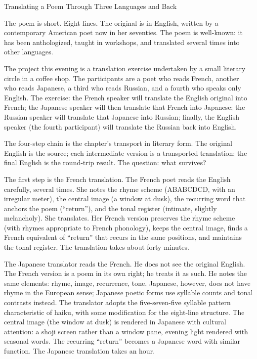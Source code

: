 \begin{coda}{Translating a Poem Through Three Languages and Back}

The poem is short. Eight lines. The original is in English, written
by a contemporary American poet now in her seventies. The poem is
well-known: it has been anthologized, taught in workshops, and
translated several times into other languages.

The project this evening is a translation exercise undertaken by a
small literary circle in a coffee shop. The participants are a
poet who reads French, another who reads Japanese, a third who
reads Russian, and a fourth who speaks only English. The
exercise: the French speaker will translate the English original
into French; the Japanese speaker will then translate that French
into Japanese; the Russian speaker will translate that Japanese
into Russian; finally, the English speaker (the fourth participant)
will translate the Russian back into English.

The four-step chain is the chapter's transport in literary form.
The original English is the source; each intermediate version is
a transported translation; the final English is the round-trip
result. The question: what survives?

The first step is the French translation. The French poet reads
the English carefully, several times. She notes the rhyme scheme
(ABABCDCD, with an irregular meter), the central image (a
window at dusk), the recurring word that anchors the poem
(``return''), and the tonal register (intimate, slightly
melancholy). She translates. Her French version preserves the
rhyme scheme (with rhymes appropriate to French phonology), keeps
the central image, finds a French equivalent of ``return'' that
recurs in the same positions, and maintains the tonal register.
The translation takes about forty minutes.

The Japanese translator reads the French. He does not see the
original English. The French version is a poem in its own right;
he treats it as such. He notes the same elements: rhyme,
image, recurrence, tone. Japanese, however, does not have rhyme
in the European sense; Japanese poetic forms use syllable counts
and tonal contrasts instead. The translator adopts the
five-seven-five syllable pattern characteristic of haiku, with
some modification for the eight-line structure. The central image
(the window at dusk) is rendered in Japanese with cultural
attention: a shoji screen rather than a window pane, evening
light rendered with seasonal words. The recurring ``return''
becomes a Japanese word with similar function. The Japanese
translation takes an hour.


\end{coda}
